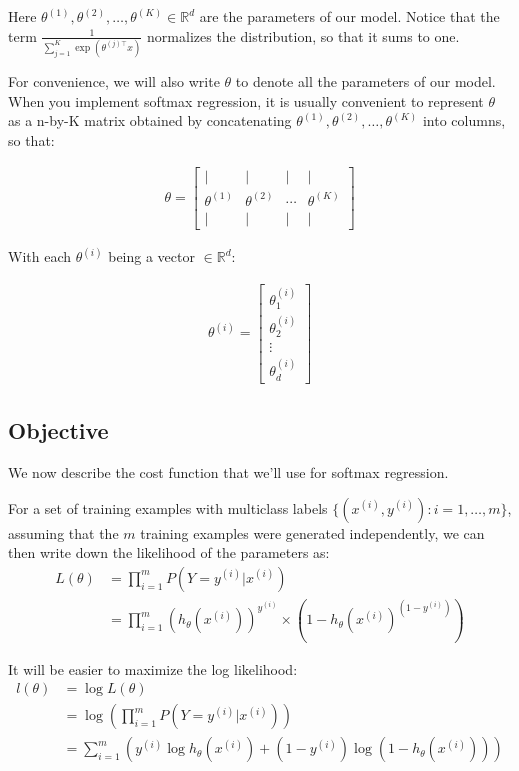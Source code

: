 Here $\theta^{(1)}, \theta^{(2)}, \ldots, \theta^{(K)} \in \mathbb{R}^{d}$ are the parameters of our model. Notice that the term $\frac{1}{ \sum_{j=1}^{K}{\exp(\theta^{(j)\top} x) } }$ normalizes the distribution, so that it sums to one.

For convenience, we will also write $\theta$ to denote all the parameters of our model. When you implement softmax regression, it is usually convenient to represent $\theta$ as a n-by-K matrix obtained by concatenating $\theta^{(1)}, \theta^{(2)}, \ldots, \theta^{(K)}$ into columns, so that:

\begin{align}
	\theta = \left[\begin{array}{cccc}| & | & | & | \\ \theta^{(1)} & \theta^{(2)} & \cdots & \theta^{(K)} \\ | & | & | & | \end{array}\right]
\end{align}

With each $\theta^{(i)}$ being a vector $\in \mathbb{R}^{d}$:

\begin{align}
	\theta^{(i)} = \left[
		\begin{array}{cccc}
			\theta_{1}^{(i)} \\
			\theta_{2}^{(i)} \\
			\vdots \\
			\theta_{d}^{(i)}
		\end{array}\right]
\end{align}


\subsection{Objective}

We now describe the cost function that we’ll use for softmax regression.

For a set of training examples with multiclass labels $\{ (x^{(i)}, y^{(i)}) : i=1,\ldots,m\}$, assuming that the $m$ training examples were generated independently, we can then write down the likelihood of the parameters as:
\begin{align}
	L(\theta) &= \prod_{i=1}^m P(Y=y^{(i)} | x^{(i)} ) \\
			  &= \prod_{i=1}^m (h_\theta(x^{(i)}))^{y^{(i)}} \times (1 - h_\theta(x^{(i)})^{(1-y^{(i)})})
\end{align}

It will be easier to maximize the log likelihood:
\begin{align}
	l(\theta) &= \log L(\theta) \\
			  &= \log \left( \prod_{i=1}^m P(Y=y^{(i)} | x^{(i)}) \right) \\
			  &= \sum_{i=1}^m \left( y^{(i)}\log h_\theta(x^{(i)}) + (1-y^{(i)})\log (1 - h_\theta(x^{(i)})) \right)
\end{align}

